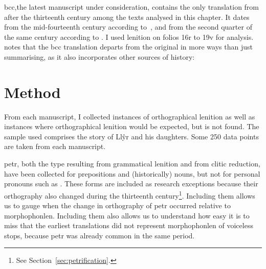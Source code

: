 \Acrfull{bcc},the latest manuscript under consideration, contains the only translation from after the thirteenth century among the texts analysed in this chapter.
It dates from the mid-fourteenth century according to~\textcite[xlv]{Rob_Astudiaeth69}, and from the second quarter of the same century according to \textcite[xviii]{Jon_Brenhinedd71}.
I used lenition on folios 16r to 19v for analysis.
\Textcite{Rob_Testunau74} notes that the \gls{bcc} translation departs from the original in more ways than just summarising, as it also incorporates other sources of history:



\section{Method}
\label{sec:method}
From each manuscript, I  collected instances of orthographical
lenition as well as instances  where orthographical lenition would
be expected, but is not found. The sample used comprises the
story of Llŷr and his daughters.  Some 250 data points are taken
from each manuscript.

\Gls{petr}, both the type resulting from grammatical lenition and from clitic reduction, have been collected for prepositions
and (historically) nouns, but not for personal pronouns such
as . These forms are included 
as research exceptions because their orthography also changed during the
thirteenth century\footnote{See Section~\ref{sec:petrification}.}. Including them allows
us to gauge when the change in orthography of \gls{petr} occurred relative to \gls{morphophonlen}.
Including them also allows us to understand how easy it is to miss that the earliest translations did not represent  \gls{morphophonlen} of voiceless stops, because \gls{petr} was already common in the same period.

